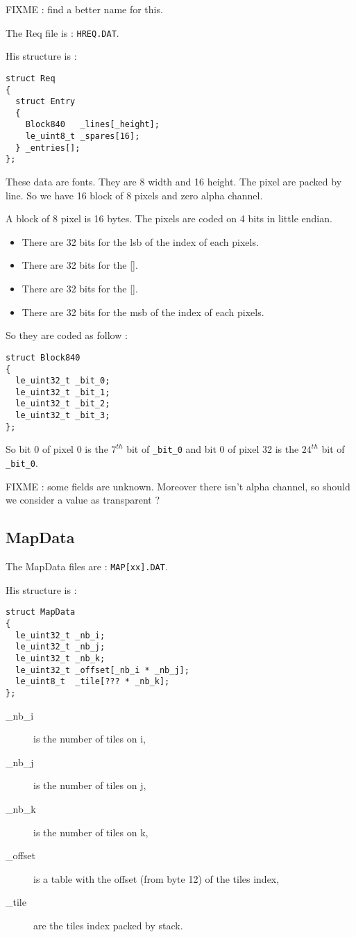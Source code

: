 \documentclass[a4paper,twoside,12pt,dvips]{article}
\begin{document}
FIXME : find a better name for this.

The Req file is : \texttt{HREQ.DAT}.

His structure is :

\begin{lstlisting}
struct Req
{
  struct Entry
  {
    Block840   _lines[_height];
    le_uint8_t _spares[16];
  } _entries[];
};
\end{lstlisting}

These data are fonts. They are 8 width and 16 height. The pixel are packed by line. So we have 16 block of 8 pixels and zero alpha channel.

A block of 8 pixel is 16 bytes. The pixels are coded on 4 bits in little endian.
\begin{itemize}
\item There are 32 bits for the lsb of the index of each pixels.
\item There are 32 bits for the [].
\item There are 32 bits for the [].
\item There are 32 bits for the msb of the index of each pixels.
\end{itemize}
So they are coded as follow :
\begin{lstlisting}
struct Block840
{
  le_uint32_t _bit_0;
  le_uint32_t _bit_1;
  le_uint32_t _bit_2;
  le_uint32_t _bit_3;
};
\end{lstlisting}

So bit 0 of pixel 0 is the $7^{th}$ bit of \texttt{\_bit\_0} and bit 0 of pixel 32 is the $24^{th}$ bit of \texttt{\_bit\_0}.

FIXME : some fields are unknown. Moreover there isn't alpha channel, so should we consider a value as transparent ?

\subsection{MapData}
\label{sec:mapdata}

The MapData files are : \texttt{MAP[xx].DAT}.

His structure is :

\begin{lstlisting}
struct MapData
{
  le_uint32_t _nb_i;
  le_uint32_t _nb_j;
  le_uint32_t _nb_k;
  le_uint32_t _offset[_nb_i * _nb_j];
  le_uint8_t  _tile[??? * _nb_k];
};
\end{lstlisting}

\begin{description}
\item[\_nb\_i] is the number of tiles on i,
\item[\_nb\_j] is the number of tiles on j,
\item[\_nb\_k] is the number of tiles on k,
\item[\_offset] is a table with the offset (from byte 12) of the tiles index,
\item[\_tile] are the tiles index packed by stack.
\end{description}
\end{document}
